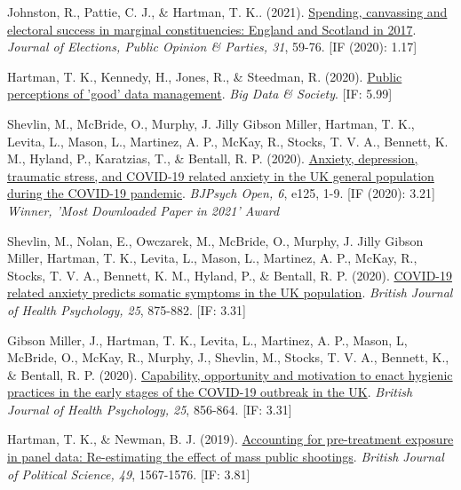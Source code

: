 \documentclass[12pt]{article}
\begin{document}
\begin{bibenum}
	\item Johnston, R., Pattie, C. J., \& {Hartman, T. K.}. (2021). 
		\href{https://10.1080/17457289.2019.1582534}
		{Spending, canvassing and electoral success in marginal constituencies: 
		England and Scotland in 2017}. 
		\emph{Journal of Elections, Public Opinion \& Parties, 31}, 59-76. [IF (2020): 1.17]
		
	\item Hartman, T. K., Kennedy, H., Jones, R., \& Steedman, R. (2020). 
		\href{https://10.1177/2053951720935616}{Public perceptions of 'good' data management}.
	 	\emph{Big Data \& Society}. [IF: 5.99]
		
	\item Shevlin, M.,  McBride, O., Murphy, J. Jilly Gibson Miller, Hartman, T. K., 
	Levita, L., Mason, L., Martinez, A. P., McKay, R., Stocks, T. V. A., 
	Bennett, K. M., Hyland, P., Karatzias, T., \& Bentall, R. P. (2020). 
		\href{https://10.1192/bjo.2020.109}{Anxiety, depression, traumatic stress, 
		and COVID-19 related anxiety in the UK general population during the COVID-19 pandemic}.
		\emph{BJPsych Open, 6}, e125, 1-9. [IF (2020): 3.21]\\
		\textit{Winner, 'Most Downloaded Paper in 2021' Award}

	\item Shevlin, M., Nolan, E., Owczarek, M., McBride, O., Murphy, J. Jilly Gibson Miller, 
	Hartman, T. K., Levita, L., Mason, L., Martinez, A. P., McKay, R., Stocks, T. V. A., 
	Bennett, K. M., Hyland, P., \& Bentall, R. P. (2020). 
		\href{https://10.1111/bjhp.12430}{COVID-19 related anxiety predicts somatic 
		symptoms in the UK population}.
	 	\emph{British Journal of Health Psychology, 25}, 875-882. [IF: 3.31]

	\item Gibson Miller, J., Hartman, T. K., Levita, L., Martinez, A. P., Mason, L, 
	McBride, O., McKay, R., Murphy, J., Shevlin, M., Stocks, T. V. A., Bennett, K., 
	\& Bentall, R. P. (2020). 
		\href{https://10.1111/bjhp.12426}{Capability, opportunity and motivation 
		to enact hygienic practices in the early stages of the COVID-19 outbreak in the UK}.
		\emph{British Journal of Health Psychology, 25}, 856-864. [IF: 3.31]
		
    \item *{Hartman, T. K.}, \& Newman, B. J. (2019).
          \href{https://10.1017/S0007123418000467}
          {Accounting for pre-treatment exposure in panel data: 
          Re-estimating the effect of mass public shootings}.
          \emph{British Journal of Political Science, 49}, 1567-1576. [IF: 3.81]


\end{bibenum}
\end{document}
